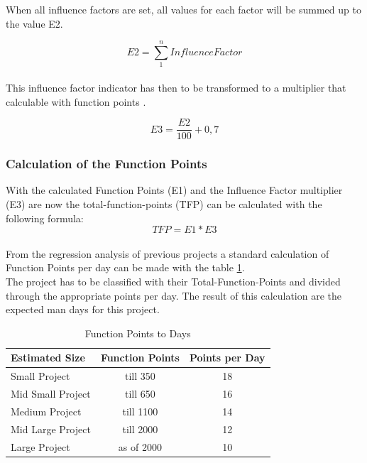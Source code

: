 When all influence factors are set, all values for each factor will be summed up to the value E2. 

\begin{equation}
E2 =  \sum \limits_{1}^n   Influence Factor  \label{fp:E2}
\end{equation}\\
This influence factor indicator has then to be transformed to a multiplier that calculable with function points \cite{Softwaremanagement}\cite{fpafundamentals}.  

\begin{equation}
	E3 =\frac{E2}{100}  + 0,7 \label{fp:E3}
\end{equation}

\subsubsection{Calculation of the Function Points}

With the calculated Function Points (E1) and the Influence Factor multiplier (E3) are now the total-function-points (TFP) can be calculated with the following formula:
\begin{equation}
	TFP = E1 * E3  \label{fp:TFP}
\end{equation}\\
From the regression analysis of previous projects a standard calculation of Function Points per day can be made with the table \ref{tab:pointsperday}.\\
The project has to be classified with their Total-Function-Points and divided through the appropriate points per day. The result of this calculation are the expected man days for this project.\\
\begin{table}[h] 
	\centering 
	\setlength{\tabcolsep}{4pt}
	\begin{tabular}{|l||c|c|}\hline
		Estimated Size    & Function Points & Points per Day\\ \hline\hline
		Small Project     & till 350        & 18 \\ \hline
		Mid Small Project & till 650        & 16 \\ \hline
		Medium Project    & till 1100 		& 14 \\ \hline
		Mid Large Project & till 2000 		& 12\\ \hline
		Large Project     & as of 2000 		& 10 \\ \hline
	\end{tabular}
	\caption{Function Points to Days} 
	\label{tab:pointsperday} 
\end{table} 

